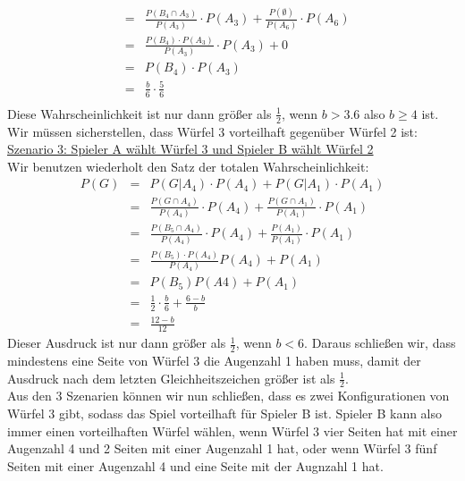 \begin{Answer}
\begin{eqnarray*}
				&=&\frac{P(B_4\cap A_3)}{P(A_3)}\cdot P(A_3)+\frac{P(\emptyset)}{P(A_6)}\cdot P(A_6)\\
				&=&\frac{P(B_4)\cdot P(A_3)}{P(A_3)}\cdot P(A_3)+0\\
				&=& P(B_4)\cdot P(A_3)\\
				&=&\frac{b}{6}\cdot \frac{5}{6}\\
			\end{eqnarray*}
		Diese Wahrscheinlichkeit ist nur dann größer als $\frac{1}{2}$, wenn $b>3.6$ also $b\geq 4$ ist.\\
		Wir müssen sicherstellen, dass Würfel 3 vorteilhaft gegenüber Würfel 2 ist:\\
		\underline{Szenario 3: Spieler A wählt Würfel 3 und Spieler B wählt Würfel 2}\\
		Wir benutzen wiederholt den Satz der totalen Wahrscheinlichkeit:
		\begin{eqnarray*}
			P(G)&=&P(G\vert A_4)\cdot P(A_4)+P(G\vert A_1)\cdot P(A_1)\\
			&=&\frac{P(G\cap A_4)}{P(A_4)}\cdot P(A_4)+\frac{P(G\cap A_1)}{P(A_1)}\cdot P(A_1)\\
			&=&\frac{P(B_5\cap A_4)}{P(A_4)}\cdot P(A_4)+\frac{P(A_1)}{P(A_1)}\cdot P(A_1)\\
			&=&\frac{P(B_5)\cdot P(A_4)}{P(A_4)}P(A_4)+P(A_1)\\
			&=&P(B_5)P(A4)+P(A_1)\\
			&=&\frac{1}{2}\cdot \frac{b}{6}+ \frac{6-b}{b}\\
			&=&\frac{12-b}{12}
		\end{eqnarray*}
		Dieser Ausdruck ist nur dann größer als $\frac{1}{2}$, wenn $b<6$.
		Daraus schließen wir, dass mindestens eine Seite von Würfel 3 die Augenzahl 1 haben muss, damit der Ausdruck nach dem letzten Gleichheitszeichen größer ist als $\frac{1}{2}$.\\
		\medspace
		Aus den 3 Szenarien können wir nun schließen, dass es zwei Konfigurationen von Würfel 3 gibt, sodass das Spiel vorteilhaft für Spieler B ist. Spieler B kann also immer einen vorteilhaften Würfel wählen, wenn Würfel 3 vier Seiten hat mit einer Augenzahl 4 und 2 Seiten mit einer Augenzahl 1 hat, oder wenn Würfel 3 fünf Seiten mit einer Augenzahl 4 und eine Seite mit der Augnzahl 1 hat.
\end{Answer}


